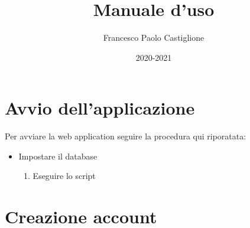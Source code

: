 \documentclass{article}
\title{Manuale d'uso}
\author{Francesco Paolo Castiglione}
\date{2020-2021}
\begin{document}
\maketitle

\tableofcontents

\section{Avvio dell'applicazione}

Per avviare la web application seguire la procedura qui riporatata:

\begin{itemize}
	\item Impostare il database
	\begin{enumerate}
		\item Eseguire lo script
	\end{enumerate}
\end{itemize}

\section{Creazione account}
\end{document}
